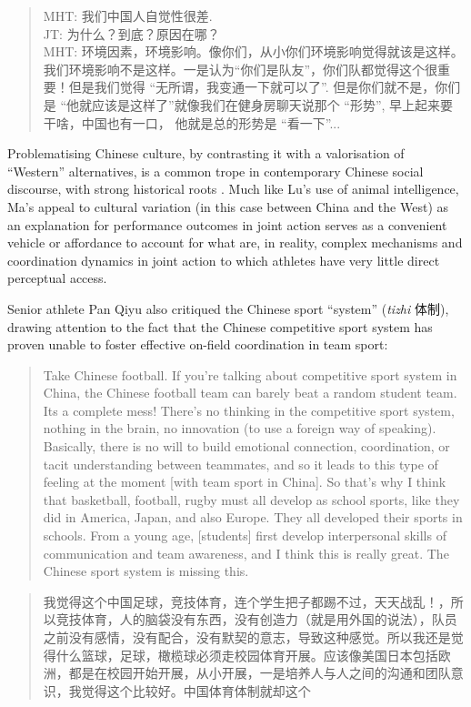 \begin{CJK}{UTF8}{gbsn}
\begin{quote}
  MHT: 我们中国人自觉性很差. \\
  JT: 为什么？到底？原因在哪？\\
  MHT: 环境因素，环境影响。像你们，从小你们环境影响觉得就该是这样。我们环境影响不是这样。一是认为``你们是队友''，你们队都觉得这个很重要！但是我们觉得 ``无所谓，我变通一下就可以了''. 但是你们就不是，你们是 ``他就应该是这样了''就像我们在健身房聊天说那个 ``形势'', 早上起来要干啥，中国也有一口， 他就是总的形势是  ``看一下''...
\end{quote}

Problematising Chinese culture, by contrasting it with a valorisation of ``Western'' alternatives, is a common trope in contemporary Chinese social discourse, with strong historical roots \citep{Liu1995a}.  Much like Lu's use of animal intelligence, Ma's appeal to cultural variation (in this case between China and the West) as an explanation for performance outcomes in joint action serves as a convenient vehicle or affordance to account for what are, in reality, complex mechanisms and coordination dynamics in joint action to which athletes have very little direct perceptual access.

Senior athlete Pan Qiyu also critiqued the Chinese sport ``system'' (\textit{tizhi} 体制), drawing attention to the fact that the Chinese competitive sport system has proven unable to foster effective on-field coordination in team sport:

\begin{quote}
  Take Chinese football.  If you’re talking about competitive sport system in China, the Chinese football team can barely beat a random student team. Its a complete mess! There’s no thinking in the competitive sport system, nothing in the brain, no innovation (to use a foreign way of speaking).  Basically, there is no will to build emotional connection, coordination, or tacit understanding between teammates, and so it leads to this type of feeling at the moment [with team sport in China].  So that's why I think that basketball, football, rugby must all develop as school sports, like they did in America, Japan, and also Europe. They all developed their sports in schools. From a young age, [students] first develop interpersonal skills of communication and team awareness, and I think this is really great.  The Chinese sport system is missing this.
\end{quote}

\begin{quote}
  我觉得这个中国足球，竞技体育，连个学生把子都踢不过，天天战乱！，所以竞技体育，人的脑袋没有东西，没有创造力（就是用外国的说法），队员之前没有感情，没有配合，没有默契的意志，导致这种感觉。所以我还是觉得什么篮球，足球，橄榄球必须走校园体育开展。应该像美国日本包括欧洲，都是在校园开始开展，从小开展，一是培养人与人之间的沟通和团队意识，我觉得这个比较好。中国体育体制就却这个
\end{quote}


\end{CJK}
